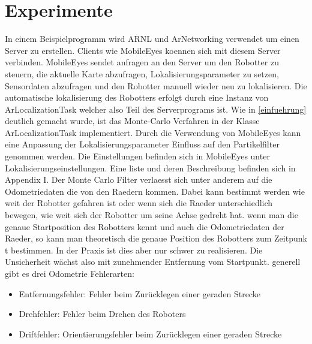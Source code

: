 \documentclass{article}
\begin{document}
\section{Experimente}

In einem Beispielprogramm wird ARNL und ArNetworking verwendet um einen Server zu erstellen. Clients wie MobileEyes koennen sich mit diesem Server verbinden. MobileEyes sendet anfragen an den Server um den Robotter zu steuern, die aktuelle Karte abzufragen, Lokalisierungsparameter zu setzen, Sensordaten abzufragen und den Robotter manuell wieder neu zu lokalisieren.
Die automatische lokalisierung des Robotters erfolgt durch eine Instanz von ArLocalizationTask welcher also Teil des Serverprograms ist. Wie in \ref{einfuehrung} deutlich gemacht wurde, ist das Monte-Carlo Verfahren in der Klasse ArLocalizationTask implementiert.
Durch die Verwendung von MobileEyes kann eine Anpassung der Lokalisierungsparameter Einfluss auf den Partikelfilter genommen werden.
Die Einstellungen befinden sich in MobileEyes unter Lokalisierungseinstellungen. Eine  liste und deren Beschreibung befinden sich in Appendix I.
Der Monte Carlo Filter verlaesst sich unter anderem auf die Odometriedaten die von den Raedern kommen. Dabei kann bestimmt werden wie weit der Robotter gefahren ist oder wenn sich die Raeder unterschiedlich bewegen, wie weit sich der Robotter um seine Achse gedreht hat. wenn man die genaue Startposition des Robotters kennt und auch die Odometriedaten der Raeder, so kann man theoretisch die genaue Position des Robotters zum Zeitpunk t bestimmen. In der Praxis ist dies aber nur schwer zu realisieren. Die Unsicherheit
wächst also mit zunehmender Entfernung vom Startpunkt. generell gibt es drei Odometrie Fehlerarten:
\begin{itemize}
\item Entfernungsfehler: Fehler beim Zur\"ucklegen einer geraden Strecke
\item Drehfehler: Fehler beim Drehen des Roboters
\item Driftfehler: Orientierungsfehler beim Zur\"ucklegen einer geraden Strecke
\end{itemize}
\end{document}
